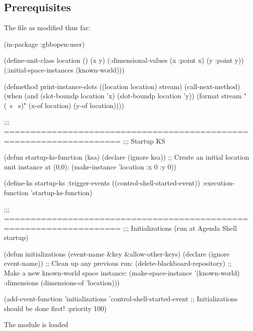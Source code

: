 \documentclass[10pt,twoside,english,pdftex]{article}
\begin{document}
\fndocrule

\subsection*{Prerequisites}

\begin{tightitemize}
\item The  file as modified thus far:
\end{tightitemize}
%
\W\supp
\begin{example}
  (in-package :gbbopen-user)

  (define-unit-class location ()
    (x y)
    (:dimensional-values
      (x :point x)
      (y :point y))
    (:initial-space-instances (known-world)))

  (defmethod print-instance-slots ((location location) stream)
    (call-next-method)
    (when (and (slot-boundp location 'x)
               (slot-boundp location 'y))
      (format stream " (~s ~s)"
              (x-of location)
              (y-of location))))

  ;;; ====================================================================
  ;;;   Startup KS

  (defun startup-ks-function (ksa)
    (declare (ignore ksa))
    ;; Create an initial location unit instance at (0,0):
    (make-instance 'location :x 0 :y 0))

  (define-ks startup-ks
      :trigger-events ((control-shell-started-event))
      :execution-function 'startup-ks-function)

  ;;; ====================================================================
  ;;;   Initializations (run at Agenda Shell startup)

  (defun initializations (event-name &key &allow-other-keys)
    (declare (ignore event-name))
    ;; Clean up any previous run:
    (delete-blackboard-repository)
    ;; Make a new known-world space instance:
    (make-space-instance 
     '(known-world)
     :dimensions (dimensions-of 'location)))

  (add-event-function 'initializations 'control-shell-started-event
                      ;; Initializations should be done first!
                      :priority 100)
\end{example}

\begin{tightitemize}
\item The  module is loaded
\end{tightitemize}
\end{document}
